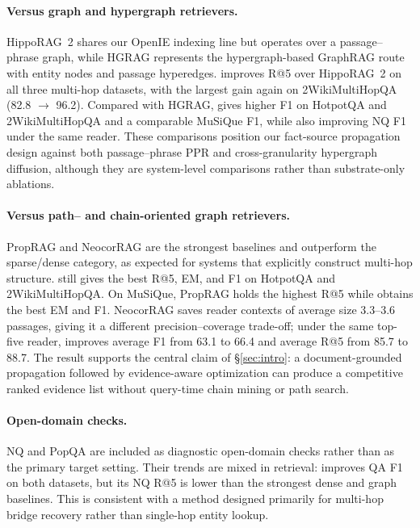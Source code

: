 \paragraph{Versus graph and hypergraph retrievers.}
HippoRAG~2 shares our OpenIE indexing line but operates over a
passage--phrase graph, while HGRAG represents the hypergraph-based
GraphRAG route with entity nodes and passage hyperedges. \methodname{}
improves R@5 over HippoRAG~2 on all three multi-hop datasets, with the
largest gain again on 2WikiMultiHopQA (82.8 $\to$ 96.2). Compared with
HGRAG, \methodname{} gives higher F1 on HotpotQA and 2WikiMultiHopQA
and a comparable MuSiQue F1, while also improving NQ F1 under the same
reader. These comparisons position our fact-source propagation design
against both passage--phrase PPR and cross-granularity hypergraph
diffusion, although they are system-level comparisons rather than
substrate-only ablations.

\paragraph{Versus path-- and chain-oriented graph retrievers.}
PropRAG and NeocorRAG are the strongest baselines and outperform the
sparse/dense category, as expected for systems that explicitly
construct multi-hop structure. \methodname{} still gives the best R@5,
EM, and F1 on HotpotQA and 2WikiMultiHopQA. On MuSiQue, PropRAG holds
the highest R@5 while \methodname{} obtains the best EM and F1.
NeocorRAG saves reader contexts of average size 3.3--3.6 passages,
giving it a different precision--coverage trade-off; under the same
top-five reader, \methodname{} improves average F1 from 63.1 to 66.4
and average R@5 from 85.7 to 88.7. The result supports the central
claim of \S\ref{sec:intro}: a document-grounded propagation followed
by evidence-aware optimization can produce a competitive ranked
evidence list without query-time chain mining or path search.

\paragraph{Open-domain checks.}
NQ and PopQA are included as diagnostic open-domain checks rather than
as the primary target setting. Their trends are mixed in retrieval:
\methodname{} improves QA F1 on both datasets, but its NQ R@5 is lower
than the strongest dense and graph baselines. This is consistent with a
method designed primarily for multi-hop bridge recovery rather than
single-hop entity lookup.

